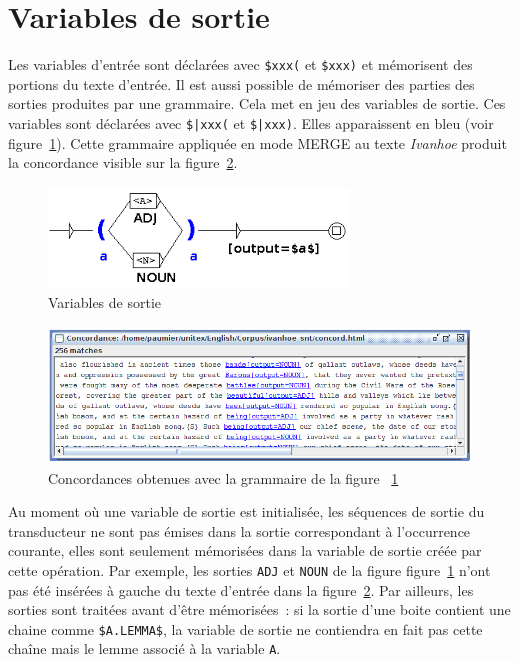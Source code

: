 

\newpage

\section{Variables de sortie}
\label{section-output-variables}
Les variables d'entrée sont déclarées avec \verb+$xxx(+ et \verb+$xxx)+ et mémorisent des portions du
texte d'entrée. 
Il est aussi possible de mémoriser des parties des sorties produites par une grammaire.
Cela met en jeu des variables de sortie.
Ces variables sont déclarées avec \verb+$|xxx(+ et \verb+$|xxx)+.
Elles apparaissent en bleu (voir figure~\ref{fig-output-variables}).
Cette grammaire appliquée en mode MERGE au texte \textit{Ivanhoe} produit la
concordance visible sur la figure~\ref{fig-output-variables-concord}. 

\begin{figure}[!ht]
\begin{center}
\includegraphics[width=8cm]{resources/img/fig6-17r.png}
\caption{Variables de sortie\label{fig-output-variables}}
\end{center}
\end{figure}

\begin{figure}[!ht]
\begin{center}
\includegraphics[width=15cm]{resources/img/fig6-17s.png}
\caption{Concordances obtenues avec la grammaire de la figure ~\ref{fig-output-variables}\label{fig-output-variables-concord}}
\end{center}
\end{figure}

\bigskip
\noindent Au moment où une variable de sortie est initialisée,
les séquences de sortie du transducteur ne sont pas émises dans la sortie correspondant à l'occurrence courante,
elles sont seulement mémorisées dans la variable de sortie créée par cette opération.
Par exemple, les sorties \verb+ADJ+ et \verb+NOUN+ de la figure figure~\ref{fig-output-variables}
n'ont pas été insérées à gauche du texte d'entrée
dans la figure~\ref{fig-output-variables-concord}.
Par ailleurs, les sorties sont traitées avant d'être mémorisées~: si la sortie d'une boite contient une chaine comme 
\verb+$A.LEMMA$+, la variable de sortie ne contiendra en fait pas cette chaîne mais le lemme associé à
la variable \verb+A+.

